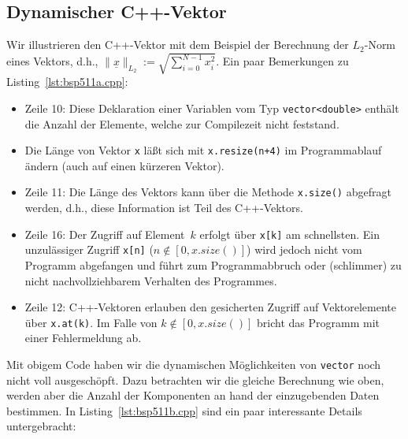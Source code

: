 \subsection{Dynamischer C++-Vektor}
\label{p:5.1.1}
%
Wir illustrieren den C++-Vektor
 mit dem Beispiel der Berechnung der $L_{2}$-Norm eines Vektors, d.h.,
$\parallel \underline{x} \parallel_{L_2} :=
 \sqrt{\sum\limits_{i=0}^{N-1} x_i^2}
$\enspace.
%
%
%
Ein paar Bemerkungen zu Listing~\ref{lst:bsp511a.cpp}:
\begin{itemize}
	\item Zeile 10: Diese Deklaration einer Variablen vom Typ \verb|vector<double>| enthält die
	Anzahl der Elemente, welche zur Compilezeit nicht feststand.
	\item Die Länge von Vektor \verb|x| läßt sich mit \verb|x.resize(n+4)| im Programmablauf ändern
	(auch auf einen kürzeren Vektor).
	\item Zeile 11: Die Länge des Vektors kann über die Methode \verb|x.size()| abgefragt werden, d.h.,
	diese Information ist Teil des C++-Vektors.
	\item Zeile 16: Der Zugriff auf Element~$k$ erfolgt über \verb|x[k]| am schnellsten.
	 Ein unzulässiger Zugriff \verb|x[n]| ($n \not\in [0,x.size()]$) wird jedoch nicht vom Programm abgefangen
	 und führt zum Programmabbruch oder (schlimmer) zu nicht nachvollziehbarem Verhalten des Programmes.
	 \item Zeile 12: C++-Vektoren erlauben den gesicherten Zugriff auf Vektorelemente über
	 \verb|x.at(k)|. Im Falle von $k \not\in [0,x.size()]$ bricht das Programm mit einer Fehlermeldung ab.
\end{itemize}
Mit obigem Code haben wir die dynamischen Möglichkeiten von \texttt{vector} noch nicht voll ausgeschöpft.
Dazu betrachten wir die gleiche Berechnung wie oben, werden aber die Anzahl der Komponenten
an hand der einzugebenden Daten bestimmen.
%
\pagebreak[2]
%
In Listing~\ref{lst:bsp511b.cpp} sind ein paar interessante Details untergebracht:

